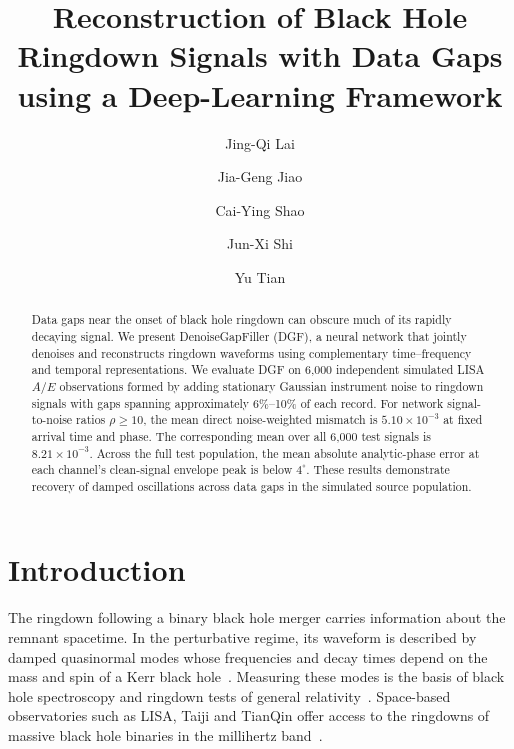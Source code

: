 \documentclass[10pt,prd,aps,a4paper,twocolumn,superscriptaddress,nofootinbib,floatfix]{revtex4-2}
\begin{document}
\title{Reconstruction of Black Hole Ringdown Signals with Data Gaps using a Deep-Learning Framework}
\author{Jing-Qi Lai}
\author{Jia-Geng Jiao}
\author{Cai-Ying Shao}

\author{Jun-Xi Shi}
\author{Yu Tian}

\begin{abstract}
Data gaps near the onset of black hole ringdown can obscure much of its rapidly decaying signal. We present DenoiseGapFiller (DGF), a neural network that jointly denoises and reconstructs ringdown waveforms using complementary time--frequency and temporal representations. We evaluate DGF on 6,000 independent simulated LISA $A/E$ observations formed by adding stationary Gaussian instrument noise to ringdown signals with gaps spanning approximately 6\%--10\% of each record. For network signal-to-noise ratios $\rho\ge10$, the mean direct noise-weighted mismatch is $5.10\times10^{-3}$ at fixed arrival time and phase. The corresponding mean over all 6,000 test signals is $8.21\times10^{-3}$. Across the full test population, the mean absolute analytic-phase error at each channel's clean-signal envelope peak is below $4^\circ$. These results demonstrate recovery of damped oscillations across data gaps in the simulated source population.
\end{abstract}

\maketitle
\section{Introduction}
The ringdown following a binary black hole merger carries information about the remnant spacetime. In the perturbative regime, its waveform is described by damped quasinormal modes whose frequencies and decay times depend on the mass and spin of a Kerr black hole~\cite{berti2006gravitational,berti2009qnm}. Measuring these modes is the basis of black hole spectroscopy and ringdown tests of general relativity~\cite{Isi_2019}. Space-based observatories such as LISA, Taiji and TianQin offer access to the ringdowns of massive black hole binaries in the millihertz band~\cite{amaroseoane2017laserinterferometerspaceantenna,robson2019construction,Ruan2020,Luo2016}.
\end{document}
